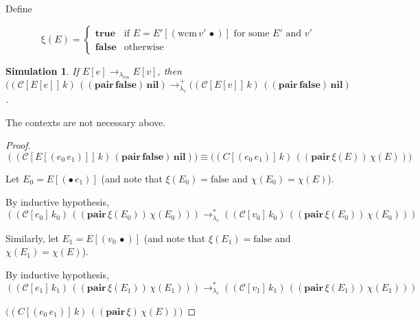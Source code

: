 \documentclass[ms,electronic,twosidetoc,letterpaper,chaptercenter,parttop]{byumsphd}
\begin{document}


Define

\[
\mathrm{\xi}(E)=\begin{cases}
\mathbf{true} &\text{if $E=E'[(\mathrm{wcm}\,v'\,\bullet)]$ for some $E'$ and $v'$}\\
\mathbf{false} &\text{otherwise}
\end{cases}
\]

\newtheorem*{simulation}{Simulation}
\begin{simulation}
If $E[e]\rightarrow_{\lambda_{cm}}E[v]$, then $((\mathcal{C}[E[e]]\,k)\,((\mathbf{pair}\,\mathbf{false})\,\mathbf{nil})\rightarrow_{\lambda_v}^{+}((\mathcal{C}[E[v]]\,k)\,((\mathbf{pair}\,\mathbf{false})\,\mathbf{nil})$.
\end{simulation}
The contexts are not necessary above.

\begin{proof}
$((\mathcal{C}[E[(e_0\,e_1)]]\,k)\,(\mathbf{pair}\,\mathbf{false})\,\mathbf{nil}))\equiv\mathcal(({C}[(e_0\,e_1)]\,k)\,((\mathbf{pair}\,\xi(E))\,\chi(E)))$

Let $E_0=E[(\bullet\,e_1)]$ (and note that $\xi(E_0)=\mathrm{false}$ and $\chi(E_0)=\chi(E)$).

By inductive hypothesis, $((\mathcal{C}[e_0]\,k_0)\,((\mathbf{pair}\,\xi(E_0))\,\chi(E_0)))\rightarrow_{\lambda_v}^{*}((\mathcal{C}[v_0]\,k_0)\,((\mathbf{pair}\,\xi(E_0))\,\chi(E_0)))$

Similarly, let $E_1=E[(v_0\,\bullet)]$ (and note that $\xi(E_1)=\mathrm{false}$ and $\chi(E_1)=\chi(E)$).

By inductive hypothesis, $((\mathcal{C}[e_1]\,k_1)\,((\mathbf{pair}\,\xi(E_1))\,\chi(E_1)))\rightarrow_{\lambda_v}^{*}((\mathcal{C}[v_1]\,k_1)\,((\mathbf{pair}\,\xi(E_1))\,\chi(E_1)))$

$\mathcal(({C}[(e_0\,e_1)]\,k)\,((\mathbf{pair}\,\xi)\,\chi(E)))$
\end{proof}
\end{document}
